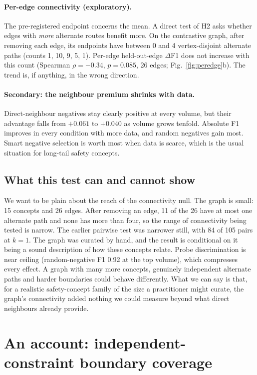 \documentclass[11pt]{article}
\newcommand{\dF}{$\Delta$F1}
\begin{document}
\paragraph{Per-edge connectivity (exploratory).} The pre-registered endpoint concerns the mean. A direct test of
H2 asks whether edges with \emph{more} alternate routes benefit more. On the contrastive graph, after removing
each edge, its endpoints have between 0 and 4 vertex-disjoint alternate paths (counts 1, 10, 9, 5, 1). Per-edge
held-out-edge \dF{} does not increase with this count (Spearman $\rho=-0.34$, $p=0.085$, 26 edges;
Fig.~\ref{fig:peredge}b). The trend is, if anything, in the wrong direction.

\paragraph{Secondary: the neighbour premium shrinks with data.} Direct-neighbour negatives stay clearly positive at
every volume, but their advantage falls from $+0.061$ to $+0.040$ as volume grows tenfold. Absolute F1 improves in
every condition with more data, and random negatives gain most. Smart negative selection is worth most when data
is scarce, which is the usual situation for long-tail safety concepts.

\subsection{What this test can and cannot show}
\label{sec:scope}
We want to be plain about the reach of the connectivity null. The graph is small: 15 concepts and 26 edges. After
removing an edge, 11 of the 26 have at most one alternate path and none has more than four, so the range of
connectivity being tested is narrow. The earlier pairwise test was narrower still, with 84 of 105 pairs at
$k=1$. The graph was curated by hand, and the result is conditional on it being a sound description of how these
concepts relate. Probe discrimination is near ceiling (random-negative F1 0.92 at the top volume), which
compresses every effect. A graph with many more concepts, genuinely independent alternate paths and harder
boundaries could behave differently. What we can say is that, for a realistic safety-concept family of the size a
practitioner might curate, the graph's connectivity added nothing we could measure beyond what direct neighbours
already provide.

\section{An account: independent-constraint boundary coverage}
\label{sec:account}
\end{document}
